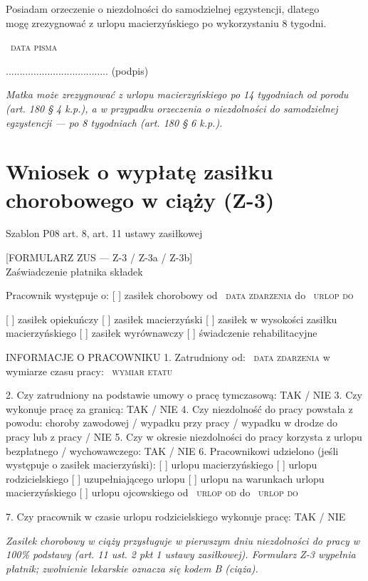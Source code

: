 \documentclass[11pt,a4paper]{article}
\newcommand{\Pole}[1]{%
  \textcolor{szary}{\dotfill}\,%
  {\scriptsize\textcolor{szary}{\textsc{#1}}}%
}
\newenvironment{warunek}[1]{%
  \par\smallskip\noindent\begin{minipage}{\linewidth}%
  \color{black}%
}{%
  \end{minipage}\par\smallskip%
}
\begin{document}
\begin{warunek}{jesli_po_8_tyg}
Posiadam orzeczenie o niezdolności do samodzielnej egzystencji, dlatego\\[-2pt]
mogę zrezygnować z urlopu macierzyńskiego po wykorzystaniu 8 tygodni.
\end{warunek}

\Pole{data pisma}
.....................................
(podpis)

\vfill
{\footnotesize\color{szary}\itshape Matka może zrezygnować z urlopu macierzyńskiego po 14 tygodniach od porodu (art. 180 \S{} 4 k.p.), a w przypadku orzeczenia o niezdolności do samodzielnej egzystencji --- po 8 tygodniach (art. 180 \S{} 6 k.p.). }

\clearpage

\section{Wniosek o wypłatę zasiłku chorobowego w ciąży (Z-3)}

{\small\color{szary}Szablon P08 \textbullet{} art. 8, art. 11 ustawy zasiłkowej}

[FORMULARZ ZUS --- Z-3 / Z-3a / Z-3b]\\[-2pt]
Zaświadczenie płatnika składek

Pracownik występuje o:
[ ] zasiłek chorobowy            od \Pole{data zdarzenia} do \Pole{urlop do}
[ ] zasiłek opiekuńczy
[ ] zasiłek macierzyński
[ ] zasiłek w wysokości zasiłku macierzyńskiego
[ ] zasiłek wyrównawczy
[ ] świadczenie rehabilitacyjne

INFORMACJE O PRACOWNIKU
1. Zatrudniony od: \Pole{data zdarzenia}     w wymiarze czasu pracy: \Pole{wymiar etatu}
2. Czy zatrudniony na podstawie umowy o pracę tymczasową: TAK / NIE
3. Czy wykonuje pracę za granicą: TAK / NIE
4. Czy niezdolność do pracy powstała z powodu: choroby zawodowej / wypadku
przy pracy / wypadku w drodze do pracy lub z pracy / NIE
5. Czy w okresie niezdolności do pracy korzysta z urlopu bezpłatnego /
wychowawczego: TAK / NIE
6. Pracownikowi udzielono (jeśli występuje o zasiłek macierzyński):
[ ] urlopu macierzyńskiego      [ ] urlopu rodzicielskiego
[ ] uzupełniającego urlopu       [ ] urlopu na warunkach urlopu macierzyńskiego
[ ] urlopu ojcowskiego
od \Pole{urlop od} do \Pole{urlop do}
7. Czy pracownik w czasie urlopu rodzicielskiego wykonuje pracę: TAK / NIE

\vfill
{\footnotesize\color{szary}\itshape Zasiłek chorobowy w ciąży przysługuje w pierwszym dniu niezdolności do pracy w 100\% podstawy (art. 11 ust. 2 pkt 1 ustawy zasiłkowej). Formularz Z-3 wypełnia płatnik; zwolnienie lekarskie oznacza się kodem B (ciąża). }
\end{document}
